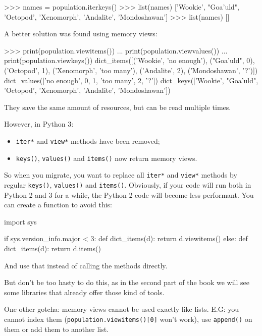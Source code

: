 \begin{py2}
>>> names = population.iterkeys()
>>> list(names)
['Wookie', "Goa'uld", 'Octopod', 'Xenomorph', 'Andalite', 'Mondoshawan']
>>> list(names)
[]
\end{py2}

A better solution was found using memory views:

\begin{py2}
>>> print(population.viewitems())
... print(population.viewvalues())
... print(population.viewkeys())
dict_items([('Wookie', 'no enough'), ("Goa'uld", 0), ('Octopod', 1), ('Xenomorph', 'too many'), ('Andalite', 2), ('Mondoshawan', '?')])
dict_values(['no enough', 0, 1, 'too many', 2, '?'])
dict_keys(['Wookie', "Goa'uld", 'Octopod', 'Xenomorph', 'Andalite', 'Mondoshawan'])
\end{py2}

They save the same amount of resources, but can be read multiple times.

However, in Python 3:

\begin{itemize}
    \item \lstinline{iter*} and \lstinline{view*} methods have been removed;
    \item \lstinline{keys()}, \lstinline{values()} and \lstinline{items()} now return memory views.
\end{itemize}

So when you migrate, you want to replace all \lstinline{iter*} and \lstinline{view*} methods by regular \lstinline{keys()}, \lstinline{values()} and \lstinline{items()}. Obviously, if your code will run both in Python 2 and 3 for a while, the Python 2 code will become less performant. You can create a function to avoid this:

\begin{py2and3}
import sys

if sys.version_info.major < 3:
    def dict_items(d):
        return d.viewitems()
else:
    def dict_items(d):
        return d.items()
\end{py2and3}

And use that instead of calling the methods directly.

But don't be too hasty to do this, as in the second part of the book we will see some libraries that already offer those kind of tools.

One other gotcha: memory views cannot be used exactly like lists. E.G: you cannot index them (\lstinline{population.viewitems()[0]} won't work), use \lstinline{append()} on them or add them to another list.

